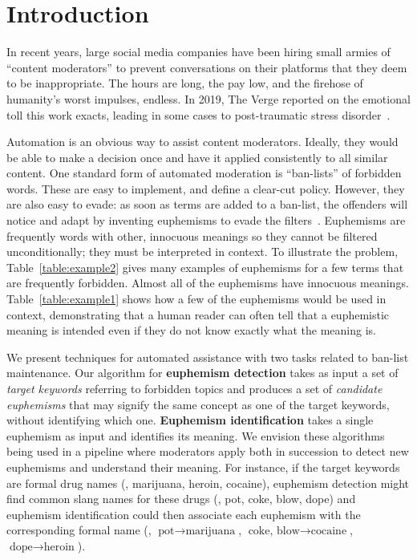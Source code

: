 \section{Introduction}
\label{sec:intro}

In recent years,
large social media companies have been hiring small armies of ``content moderators''
to prevent conversations on their platforms 
that they deem to be inappropriate.
The hours are long, 
the pay low, 
and the firehose of humanity's worst impulses, endless.
In 2019, The Verge reported on the emotional toll this work exacts,
leading in some cases
to post-traumatic stress disorder~\cite{TheVerge:Mods, TheVerge:Mods2}.

Automation is an obvious way to assist content moderators.
Ideally, they would be able to make a decision once
and have it applied consistently to all similar content.
One standard form of automated moderation is ``ban-lists'' of forbidden words.
These are easy to implement, and define a clear-cut policy.
However, they are also easy to evade:
as soon as terms are added to a ban-list,
the offenders will notice
and adapt by inventing euphemisms to evade the filters~\cite{Ofcom:AI2019}.
Euphemisms are frequently words with other, innocuous meanings
so they cannot be filtered unconditionally;
they must be interpreted in context.
To illustrate the problem,
Table~\ref{table:example2} gives many examples of euphemisms
for a few terms that are frequently forbidden.
Almost all of the euphemisms have innocuous meanings.
Table~\ref{table:example1} shows how a few of the euphemisms
would be used in context, demonstrating that
a human reader can often tell that a euphemistic meaning is intended
even if they do not know exactly what the meaning is.

We present techniques for automated assistance
with two tasks related to ban-list maintenance.
Our algorithm for \textbf{euphemism detection}
takes as input a set of \textit{target keywords} referring to forbidden topics
and produces a set of \textit{candidate euphemisms}
that may signify the same concept as one of the target keywords,
without identifying which one.
\textbf{Euphemism identification} takes a single euphemism as input
and identifies its meaning.
We envision these algorithms being used in a pipeline
where moderators apply both in succession
to detect new euphemisms and understand their meaning.
For instance, if the target keywords are formal drug names 
(\eg, marijuana, heroin, cocaine),
euphemism detection might find common slang names for these drugs
(\eg, pot, coke, blow, dope)
and euphemism identification could then associate each euphemism
with the corresponding formal name
(\eg, $\text{pot} \longrightarrow \text{marijuana}$,
$\text{coke, blow} \longrightarrow \text{cocaine}$,
$\text{dope} \longrightarrow \text{heroin}$).


